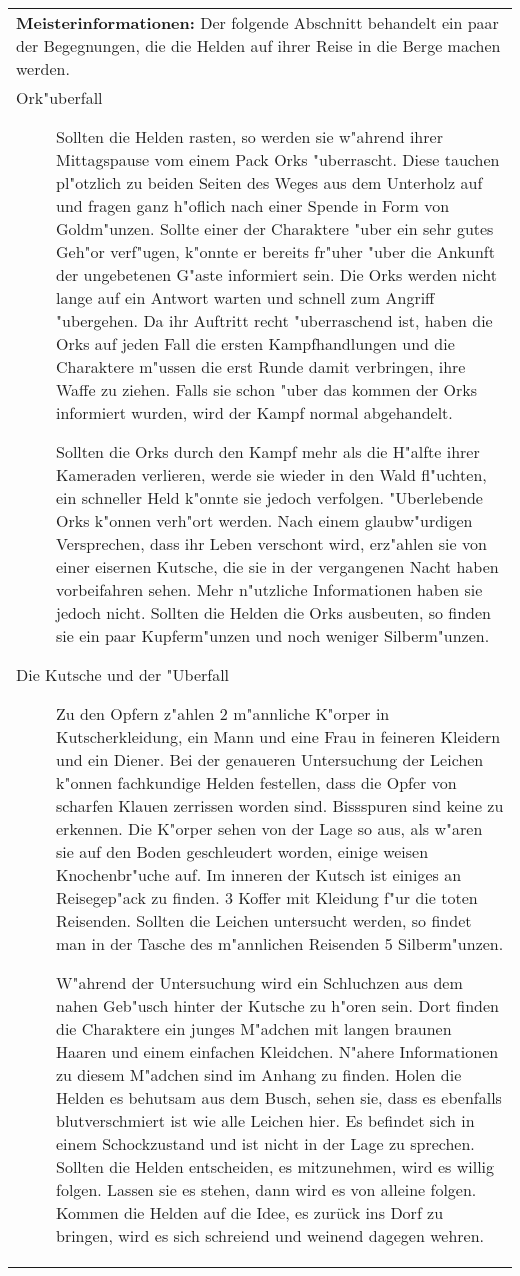 \begin{longtable}{|p{15cm}|}
\hline
\textbf{Meisterinformationen:}
Der folgende Abschnitt behandelt ein paar der Begegnungen, die die Helden auf ihrer Reise in die Berge machen werden.\\
\begin{description}
\item [Ork"uberfall] Sollten die Helden rasten, so werden sie w"ahrend ihrer Mittagspause vom einem Pack Orks "uberrascht. Diese tauchen pl"otzlich zu beiden Seiten des Weges aus dem Unterholz auf und fragen ganz h"oflich nach einer Spende in Form von Goldm"unzen. Sollte einer der Charaktere "uber ein sehr gutes Geh"or verf"ugen, k"onnte er bereits fr"uher "uber die Ankunft der ungebetenen G"aste informiert sein. Die Orks werden nicht lange auf ein Antwort warten und schnell zum Angriff "ubergehen. Da ihr Auftritt recht "uberraschend ist, haben die Orks auf jeden Fall die ersten Kampfhandlungen und die Charaktere m"ussen die erst Runde damit verbringen, ihre Waffe zu ziehen. Falls sie schon "uber das kommen der Orks informiert wurden, wird der Kampf normal abgehandelt.
\par Sollten die Orks durch den Kampf mehr als die H"alfte ihrer Kameraden verlieren, werde sie wieder in den Wald fl"uchten, ein schneller Held k"onnte sie jedoch verfolgen. "Uberlebende Orks k"onnen verh"ort werden. Nach einem glaubw"urdigen Versprechen, dass ihr Leben verschont wird, erz"ahlen sie von einer eisernen Kutsche, die sie in der vergangenen Nacht haben vorbeifahren sehen. Mehr n"utzliche Informationen haben sie jedoch nicht. Sollten die Helden die Orks ausbeuten, so finden sie ein paar Kupferm"unzen und noch weniger Silberm"unzen.
\end{description}
\begin{description}
\item [Die Kutsche und der "Uberfall] Zu den Opfern z"ahlen 2 m"annliche K"orper in Kutscherkleidung, ein Mann und eine Frau in feineren Kleidern und ein Diener. Bei der genaueren Untersuchung der Leichen k"onnen fachkundige Helden festellen, dass die Opfer von scharfen Klauen zerrissen worden sind. Bissspuren sind keine zu erkennen. Die K"orper sehen von der Lage so aus, als w"aren sie auf den Boden geschleudert worden, einige weisen Knochenbr"uche auf. Im inneren der Kutsch ist einiges an Reisegep"ack zu finden. 3 Koffer mit Kleidung f"ur die toten Reisenden. Sollten die Leichen untersucht werden, so findet man in der Tasche des m"annlichen Reisenden 5 Silberm"unzen.
\par W"ahrend der Untersuchung wird ein Schluchzen aus dem nahen Geb"usch hinter der Kutsche zu h"oren sein. Dort finden die Charaktere ein junges M"adchen mit langen braunen Haaren und einem einfachen Kleidchen. N"ahere Informationen zu diesem M"adchen sind im Anhang zu finden. Holen die Helden es behutsam aus dem Busch, sehen sie, dass es ebenfalls blutverschmiert ist wie alle Leichen hier. Es befindet sich in einem Schockzustand und ist nicht in der Lage zu sprechen. Sollten die Helden entscheiden, es mitzunehmen, wird es willig folgen. Lassen sie es stehen, dann wird es von alleine folgen. Kommen die Helden auf die Idee, es zurück ins Dorf zu bringen, wird es sich schreiend und weinend dagegen wehren.

\end{description}
\end{longtable}
